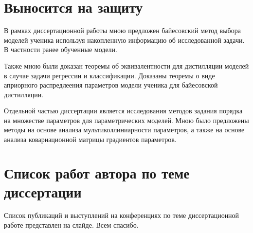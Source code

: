 \documentclass[12pt, twoside]{article}
\begin{document}
\section{Выносится на защиту}
В рамках диссертационной работы мною предложен байесовский метод выбора моделей ученика используя накопленную информацию об исследованной задачи. В частности ранее обученные модели.

Также мною были доказан теоремы об эквивалентности для дистилляции моделей в случае задачи регрессии и классификации. Доказаны теоремы о виде априорного распредлеения параметров модели ученика для байесовской дистилляции.

Отдельной частью диссертации является исследования методов задания порядка на множестве параметров для параметрических моделей. Мною было предложены методы на основе анализа мультиколлиниарности параметров, а также на основе анализа ковариационной матрицы градиентов параметров.

\section{Список работ автора по теме диссертации}
Список публикаций и выступлений на конференциях по теме диссертационной работе представлен на слайде. Всем спасибо.
\end{document}
